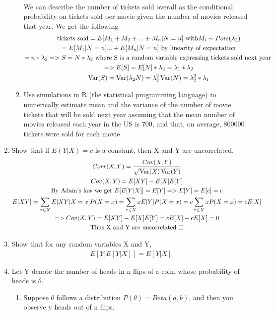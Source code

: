 \documentclass[11pt]{article}
\newcommand{\Var}{\mathop{\rm Var}}
\begin{document}
\begin{enumerate}
\begin{enumerate}
			\\
			We can describe the number of tickets sold overall as the conditional probability on tickets sold per movie given the number of movies released that year. We get the following
			\begin{gather}
			\text{tickets sold} = E[M_1+M_2+...+M_n|N=n] \text{ with} M_i \sim Pois(\lambda_2)\\
			= E[M_1|N=n]...+E[M_n|N=n] \text{ by linearity of expectation}\\
			= n*\lambda_2 => S = N*\lambda_2 \text{ where S is a random variable expressing tickets sold next year }\\=> E[S] = E[N]*\lambda_2 = \lambda_1*\lambda_2
			\\
			\Var(S) = \Var(\lambda_2N) = \lambda_2^2\Var(N) = \lambda_2^2*\lambda_1
			\end{gather}
			\item Use simulations in R (the statistical programming language) to numerically estimate mean and the
			variance of the number of movie tickets that will be sold next year assuming that the mean number of movies
			released each year in the US is 700, and that, on average, 800000 tickets were sold for each movie.
		\end{enumerate}
		\item Show that if $E(Y | X) = c$ is a constant, then X and Y are uncorrelated.
		\begin{gather}
		Corr(X,Y) = \frac{Cov(X,Y)}{\sqrt{\Var(X)\Var(Y)}}\\
		Cov(X,Y) = E[XY] - E[X]E[Y]\\
		\text{By Adam's law we get }E[E[Y|X]] = E[Y] => E[Y] = E[c] = c\\
		E[XY] = \sum_{x\in X}E[XY|X=x]P(X=x) = \sum_{x\in X}xE[Y]P(X=x) = c\sum_{x\in X}xP(X=x) = cE[X]\\
		=> Cov(X,Y) = E[XY] - E[X]E[Y] = cE[X]-cE[X] = 0\\
		\text{Thus X and Y are uncorrelated }\square
		\end{gather}
		\item Show that for any random variables X and Y,
		\begin{gather}
		E[Y|E[Y|X]]=E[Y|X]
		\end{gather}
		\item Let Y denote the number of heads in n flips of a coin, whose probability of heads is $\theta$.
		\begin{enumerate}
			\item Suppose $\theta$ follows a distribution $P(\theta) = Beta(a, b)$, and then you observe y heads out of n flips.

\end{enumerate}
\end{enumerate}
\end{document}
